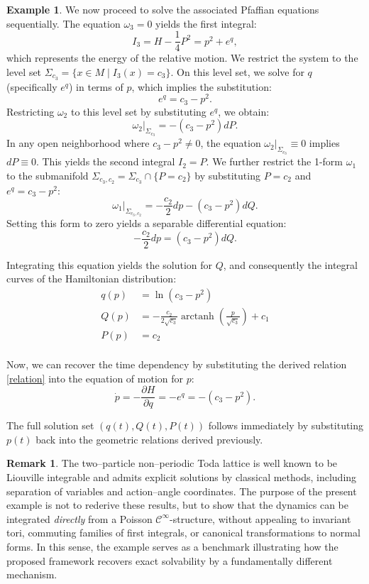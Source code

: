 \documentclass{article}
\theoremstyle{remark}
\theoremstyle{definition}
\newtheorem{remark}{Remark}[section]
\newtheorem{example}{Example}[section]
\newcommand{\cinf}{$\mathcal{C}^{\infty}$}
\begin{document}
\begin{example}
We now proceed to solve the associated Pfaffian equations sequentially. The equation $\omega_3 = 0$ yields the first integral:
\[
I_3 = H - \frac{1}{4}P^2 = p^2 + e^q,
\]
which represents the energy of the relative motion. We restrict the system to the level set $\Sigma_{c_3} = \{x \in M \mid I_3(x) = c_3\}$. On this level set, we solve for $q$ (specifically $e^q$) in terms of $p$, which implies the substitution:
\begin{equation}\label{relation}
    e^q = c_3 - p^2.
\end{equation}
Restricting $\omega_2$ to this level set by substituting $e^q$, we obtain:
\[
\omega_2|_{\Sigma_{c_3}} = -(c_3 - p^2) dP.
\]
In any open neighborhood where $c_3 - p^2 \neq 0$, the equation $\omega_2|_{\Sigma_{c_3}} \equiv 0$ implies $dP \equiv 0$. This yields the second integral $I_2 = P$. We further restrict the 1-form $\omega_1$ to the submanifold $\Sigma_{c_3, c_2} = \Sigma_{c_3} \cap \{P = c_2\}$ by substituting $P=c_2$ and $e^q = c_3 - p^2$:
\[
\omega_1|_{\Sigma_{c_3, c_2}} = -\frac{c_2}{2} dp - (c_3 - p^2) dQ.
\]
Setting this form to zero yields a separable differential equation:
\[
-\frac{c_2}{2} dp = (c_3 - p^2) dQ.
\]


Integrating this equation yields the solution for $Q$, and consequently the integral curves of the Hamiltonian distribution:
\begin{align*}
q(p)&= \ln (c_3 - p^2) \\
Q(p) &= -\frac{c_2}{2\sqrt{c_3}} \operatorname{arctanh}\left(\frac{p}{\sqrt{c_3}}\right) + c_1\\
P(p) &= c_2 \\
\end{align*}

Now, we can recover the time dependency by substituting the derived relation \eqref{relation} into the equation of motion for $p$:
\begin{equation}
    \dot{p} = - \frac{\partial H}{\partial q} = -e^q = -(c_3 - p^2).
\end{equation}

The full solution set $(q(t), Q(t), P(t))$ follows immediately by substituting $p(t)$ back into the geometric relations derived previously.
   
\end{example}


\begin{remark}
The two–particle non–periodic Toda lattice is well known to be Liouville integrable and admits explicit solutions by classical methods, including separation of variables and action--angle coordinates. The purpose of the present example is not to rederive these results, but to show that the dynamics can be integrated \emph{directly} from a Poisson \cinf-structure, without appealing to invariant tori, commuting families of first integrals, or canonical transformations to normal forms. In this sense, the example serves as a benchmark illustrating how the proposed framework recovers exact solvability by a fundamentally different mechanism.
\end{remark}
\end{document}
